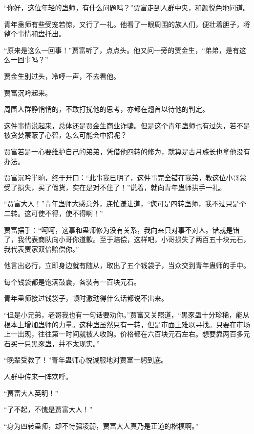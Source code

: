 
\begin{this_body}



“你好，这位年轻的蛊师，有什么问题吗？”贾富走到人群中央，和颜悦色地问道。

青年蛊师有些受宠若惊，又行了一礼。他看了一眼周围的族人们，便壮着胆子，将整个事情和盘托出。

“原来是这么一回事！”贾富听了，点点头。他又问一旁的贾金生，“弟弟，是有这么一回事吗？”

贾金生别过头，冷哼一声，不去看他。

贾富沉吟起来。

周围人群静悄悄的，不敢打扰他的思考，亦都在翘首以待他的判定。

这件事情说起来，总体还是贾金生商业诈骗。但是这个青年蛊师也有过失，若不是被贪婪蒙蔽了心智，怎么可能会中招呢？

贾富若是一心要维护自己的弟弟，凭借他四转的修为，就算是古月族长也拿他没有办法。

贾富沉吟半晌，终于开口：“此事我已明了，这件事完全错在我弟，教这位小哥蒙受了损失，买了假货，实在是对不住了！”说着，就向青年蛊师拱手一礼。

“贾富大人！”青年蛊师大感意外，连忙谦让道，“您可是四转蛊师，我不过只是个二转。这可使不得，使不得啊！”

贾富摆手：“呵呵，这事和蛊师修为没有关系，我向来只对事不对人。错就是错了，我代表商队向小哥你道歉。至于赔偿，这样吧，小哥损失了两百五十块元石，我代表贾家双倍赔偿你。”

他言出必行，立即身边就有随从，取出了五个钱袋子，当众交到青年蛊师的手中。

每个钱袋都是饱满鼓囊，各装有一百块元石。

青年蛊师接过钱袋子，顿时激动得什么话都说不出来。

“但是小兄弟，老哥我也有一句话要劝你。”贾富又关照道，“黒豕蛊十分珍稀，能从根本上增加蛊师的力量。这种蛊虽然只有一转，但是市面上难以寻找。只要在市场上一出现，往往第一时间就被人收购。价格都在六百块元石左右。想要靠两百多元石买一只黒豕蛊，并不太现实。”

“晚辈受教了！”青年蛊师心悦诚服地对贾富一躬到底。

人群中传来一阵欢呼。

“贾富大人英明！”

“了不起，不愧是贾富大人！”

“身为四转蛊师，却不恃强凌弱，贾富大人真乃是正道的楷模啊。”


\end{this_body}
